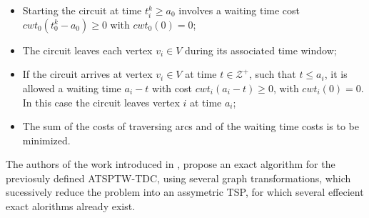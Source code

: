 \begin{itemize}
  \item Starting the circuit at time $t_{i}^{k} \geq a_0$ involves a waiting time cost $cwt_0(t_{0}^{k}-a_0) \geq 0$ with $cwt_0(0)=0$;
  \item The circuit leaves each vertex $v_i \in V$ during its associated time window;
  \item If the circuit arrives at vertex $v_i \in V$ at time $t \in \mathcal{Z}^+$,
  such that $t \leq a_i$, it is allowed a waiting time $a_i-t$ with cost $cwt_i(a_i-t) \geq 0$, with $cwt_i(0)=0$. In this case the circuit leaves vertex $i$ at time $a_i$;
  \item The sum of the costs of traversing arcs and of the waiting time costs is to be minimized.
\end{itemize}

The authors of the work introduced in \cite{tsptw_exact}, propose an exact algorithm for the previosuly defined ATSPTW-TDC,
using several graph transformations, which sucessively reduce the problem into an assymetric TSP,
for which several effecient exact alorithms already exist.


